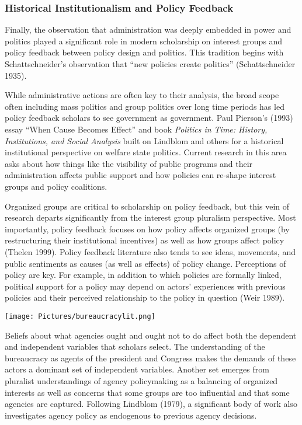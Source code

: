 \subsubsection{Historical Institutionalism and Policy Feedback}

Finally, the observation that administration was deeply embedded in power and politics played a significant role in modern scholarship on interest groups and policy feedback between policy design and politics. This tradition begins with Schattschneider's observation that ``new policies create politics'' (Schattschneider 1935). 

While administrative actions are often key to their analysis, the broad scope often including mass politics and group politics over long time periods has led policy feedback scholars to see government as government. Paul Pierson's (1993) essay ``When Cause Becomes Effect'' and book \textit{Politics in Time: History, Institutions, and Social Analysis} built on Lindblom and others for a historical institutional perspective on welfare state politics. Current research in this area asks about how things like the visibility of public programs and their administration affects public support and how policies can re-shape interest groups and policy coalitions. 

Organized groups are critical to scholarship on policy feedback, but this vein of research departs significantly from the interest group pluralism perspective. Most importantly, policy feedback focuses on how policy affects organized groups (by restructuring their institutional incentives) as well as how groups affect policy (Thelen 1999). Policy feedback literature also tends to see ideas, movements, and public sentiments as causes (as well as effects) of policy change. Perceptions of policy are key. For example, in addition to which policies are formally linked, political support for a policy may depend on actors' experiences with previous policies and their perceived relationship to the policy in question (Weir 1989). 


\texttt{[image: Pictures/bureaucracylit.png]}

Beliefs about what agencies ought and ought not to do affect both the dependent and independent variables that scholars select. The understanding of the bureaucracy as agents of the president and Congress makes the demands of these actors a dominant set of independent variables. Another set emerges from pluralist understandings of agency policymaking as a balancing of organized interests as well as concerns that some groups are too influential and that some agencies are captured. Following Lindblom (1979), a significant body of work also investigates agency policy as endogenous to previous agency decisions.


